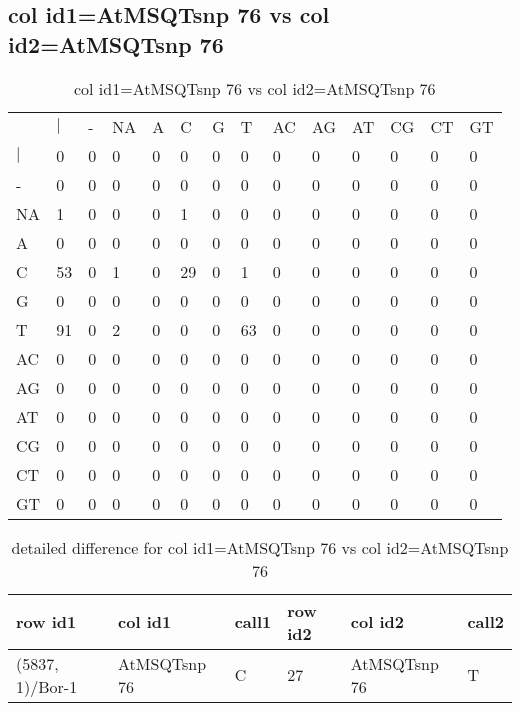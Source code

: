 \subsection{col id1=AtMSQTsnp 76 vs col id2=AtMSQTsnp 76}
\begin{center}
\begin{longtable}{|l|l|l|l|l|l|l|l|l|l|l|l|l|l|}
\caption{col id1=AtMSQTsnp 76 vs col id2=AtMSQTsnp 76} \label{table_dm764}\\
\hline
\\
\hline
&$|$&-&NA&A&C&G&T&AC&AG&AT&CG&CT&GT\\
$|$&0&0&0&0&0&0&0&0&0&0&0&0&0\\
-&0&0&0&0&0&0&0&0&0&0&0&0&0\\
NA&1&0&0&0&1&0&0&0&0&0&0&0&0\\
A&0&0&0&0&0&0&0&0&0&0&0&0&0\\
C&53&0&1&0&29&0&1&0&0&0&0&0&0\\
G&0&0&0&0&0&0&0&0&0&0&0&0&0\\
T&91&0&2&0&0&0&63&0&0&0&0&0&0\\
AC&0&0&0&0&0&0&0&0&0&0&0&0&0\\
AG&0&0&0&0&0&0&0&0&0&0&0&0&0\\
AT&0&0&0&0&0&0&0&0&0&0&0&0&0\\
CG&0&0&0&0&0&0&0&0&0&0&0&0&0\\
CT&0&0&0&0&0&0&0&0&0&0&0&0&0\\
GT&0&0&0&0&0&0&0&0&0&0&0&0&0\\
\hline
\end{longtable}
\end{center}

\begin{center}
\begin{longtable}{|l|l|l|l|l|l|}
\caption{detailed difference for col id1=AtMSQTsnp 76 vs col id2=AtMSQTsnp 76} \label{table_dm765}\\
\hline
row id1&col id1&call1&row id2&col id2&call2\\
\hline
(5837, 1)/Bor-1&AtMSQTsnp 76&C&27&AtMSQTsnp 76&T\\
\hline
\end{longtable}
\end{center}

